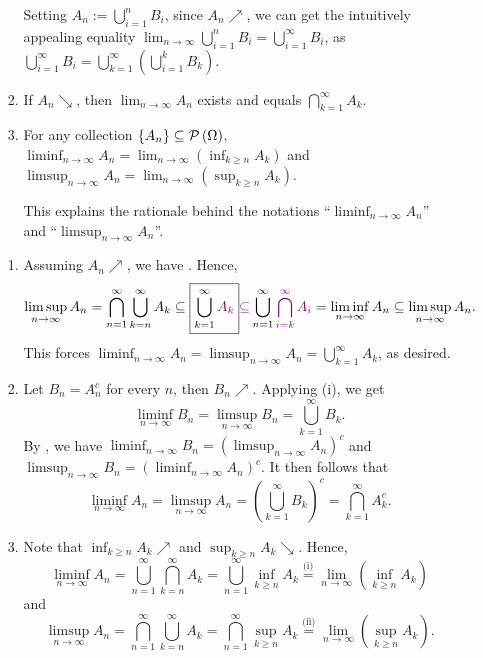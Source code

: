 \begin{enumerate}
\begin{enumerate}
\begin{enumerate}
\begin{note}
Setting \(A_n:=\bigcup_{i=1}^{n}B_i\), since \(A_n\nearrow\), we can get the
intuitively appealing equality
\(\lim_{n\to\infty}\bigcup_{i=1}^{n}B_i=\bigcup_{i=1}^{\infty}B_i\), as \(\bigcup_{i=1}^{\infty}B_i
=\bigcup_{k=1}^{\infty}\left(\bigcup_{i=1}^{k}B_k\right).\)
\end{note}
\item If \(A_n\searrow\), then \(\lim_{n\to \infty}A_n\) exists and equals \(\bigcap_{k=1}^{\infty} A_k\).
\item For any collection \(\{A_n\}\subseteq\mathcal{P}\left(\Omega\right)\), \(\liminf_{n\to \infty}A_n
=\lim_{n\to \infty}(\inf_{k\ge n}A_k)\) and \(\limsup_{n\to \infty}A_n
=\lim_{n\to \infty}(\sup_{k\ge n}A_k)\). \begin{note}
This explains the rationale behind the notations ``\(\liminf_{n\to
\infty}A_n\)'' and ``\(\limsup_{n\to \infty}A_n\)''.
\end{note}
\end{enumerate}
\begin{pf}
\begin{enumerate}
\item Assuming \(A_n\nearrow\), we have . Hence,
\[
\limsup_{n\to \infty}A_n=\bigcap_{n=1}^{\infty}\bigcup_{k=n}^{\infty}A_k
\subseteq \boxed{\bigcup_{k=1}^{\infty}{\color{violet}A_k}}
{\color{violet}\subseteq} \bigcup_{n=1}^{\infty}{\color{violet}\bigcap_{i=k}^{\infty}A_i}
=\liminf_{n\to \infty}A_n
\subseteq \limsup_{n\to \infty}A_n.
\]
This forces \(\liminf_{n\to \infty}A_n=\limsup_{n\to
\infty}A_n=\bigcup_{k=1}^{\infty}A_k\), as desired.

\item Let \(B_n=A_n^c\) for every \(n\), then \(B_n\nearrow\). Applying (i), we
get
\[
\liminf_{n\to \infty}B_n
=\limsup_{n\to \infty}B_n
=\bigcup_{k=1}^{\infty}B_k.
\]
By , we have \(\liminf_{n\to
\infty}B_n=(\limsup_{n\to \infty}A_n)^c\) and
\(\limsup_{n\to \infty}B_n=(\liminf_{n\to \infty}A_n)^c\). It then follows that
\[
\liminf_{n\to \infty}A_n=\limsup_{n\to \infty}A_n=\left(\bigcup_{k=1}^{\infty}B_k\right)^c
=\bigcap_{k=1}^{\infty}A_k^{c}.
\]
\item Note that \(\inf_{k\ge n}A_k\nearrow\) and \(\sup_{k\ge n}A_k\searrow\).
Hence,
\[
\liminf_{n\to \infty}A_n=\bigcup_{n=1}^{\infty}\bigcap_{k=n}^{\infty}A_k
=\bigcup_{n=1}^{\infty}\inf_{k\ge n}A_k
\overset{\text{(i)}}{=}\lim_{n\to \infty}\left(\inf_{k\ge n}A_k\right)
\]
and
\[
\limsup_{n\to \infty}A_n=\bigcap_{n=1}^{\infty}\bigcup_{k=n}^{\infty}A_k
=\bigcap_{n=1}^{\infty}\sup_{k\ge n}A_k
\overset{\text{(ii)}}{=}\lim_{n\to \infty}\left(\sup_{k\ge n}A_k\right).
\]
\end{enumerate}
\end{pf}


\end{enumerate}
\end{enumerate}
